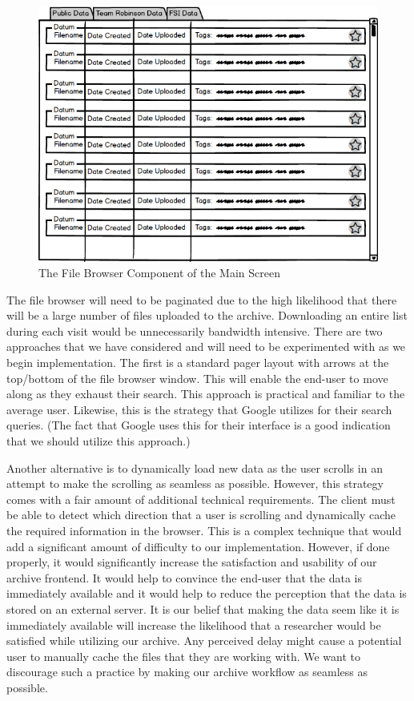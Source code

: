 \documentclass[12pt]{article}
\begin{document}
\begin{figure}[h]
	\centering
	\includegraphics[scale=0.6]{frontend_file_browser}
	\caption{The File Browser Component of the Main Screen}
	\label{fig:frontendfilebrowser}
\end{figure}

The file browser will need to be paginated due to the high likelihood that there will be a large number of files uploaded to the archive. Downloading an entire list during each visit would be unnecessarily bandwidth intensive. There are two approaches that we have considered and will need to be experimented with as we begin implementation. The first is a standard pager layout with arrows at the top/bottom of the file browser window. This will enable the end-user to move along as they exhaust their search. This approach is practical and familiar to the average user. Likewise, this is the strategy that Google utilizes for their search queries. (The fact that Google uses this for their interface is a good indication that we should utilize this approach.) 

Another alternative is to dynamically load new data as the user scrolls in an attempt to make the scrolling as seamless as possible. However, this strategy comes with a fair amount of additional technical requirements. The client must be able to detect which direction that a user is scrolling and dynamically cache the required information in the browser. This is a complex technique that would add a significant amount of difficulty to our implementation. However, if done properly, it would significantly increase the satisfaction and usability of our archive frontend. It would help to convince the end-user that the data is immediately available and it would help to reduce the perception that the data is stored on an external server. It is our belief that making the data seem like it is immediately available will increase the likelihood that a researcher would be satisfied while utilizing our archive. Any perceived delay might cause a potential user to manually cache the files that they are working with. We want to discourage such a practice by making our archive workflow as seamless as possible.
\end{document}
